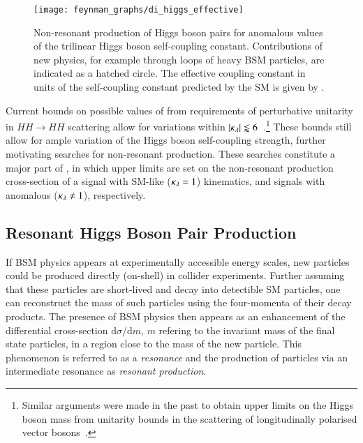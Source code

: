 \begin{figure}[htbp]
  \centering

  \texttt{[image: feynman\_graphs/di\_higgs\_effective]}

  \caption{Non-resonant production of Higgs boson pairs for anomalous values of
    the trilinear Higgs boson self-coupling constant.  Contributions of new
    physics, for example through loops of heavy BSM particles, are indicated as
    a hatched circle. The effective coupling constant in units of the
    self-coupling constant predicted by the SM is given by \klambda.}%
  \label{fig:bsm_hh_prod_feyn}
\end{figure}

%
Current bounds on possible values of \klambda from requirements of perturbative
unitarity in $HH \to HH$ scattering allow for variations within
$|\kappa_{\lambda}| \lessapprox 6$~\cite{DiLuzio:2017tfn}.\footnote{Similar arguments
  were made in the past to obtain upper limits on the Higgs boson mass from
  unitarity bounds in the scattering of longitudinally polarised vector
  bosons~\cite{Lee:1977eg}.} These bounds still allow for ample variation of the
Higgs boson self-coupling strength, further motivating searches for non-resonant
\HH production. These searches constitute a major part of
, in which upper limits are set on the
non-resonant \HH production cross-section of a signal with SM-like
($\kappa_{\lambda} = 1$) kinematics, and signals with anomalous \klambda
($\kappa_{\lambda} \neq 1$), respectively.



\subsection{Resonant Higgs Boson Pair Production}%
\label{sec:bsm_resonant_hh}

If BSM physics appears at experimentally accessible energy scales, new particles
could be produced directly (on-shell) in collider experiments. Further assuming
that these particles are short-lived and decay into detectible SM particles, one
can reconstruct the mass of such particles using the four-momenta of their decay
products. The presence of BSM physics then appears as an enhancement of the
differential cross-section $\mathrm{d}\sigma / \mathrm{d}m$, $m$ refering to the
invariant mass of the final state particles, in a region close to the mass of
the new particle. This phenomenon is referred to as a \emph{resonance} and the
production of particles via an intermediate resonance as \emph{resonant
  production}.

